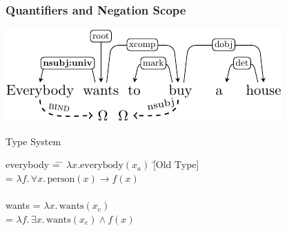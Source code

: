 \documentclass[mathserif,12pt]{beamer}
\renewcommand{\land}{\wedge}
\newcommand{\lspace}{.\,}
\begin{document}
\begin{frame}
\frametitle{Quantifiers and Negation Scope}
\centering
\includegraphics[trim=0em 0em 0em 0em,clip=true,scale=1.1]{figures/everybody-wants-buy-house-enhanced-with-univ-crop}

\begin{block}{\large Type System}
\large
\begin{tabbing}
everybody \= =  \= $\lambda x. \mathrm{everybody}(x_a)$ \hspace{2.8em} \=  [Old Type]\\
\> = \> $\lambda f \lspace \forall x \lspace \mathrm{person}(x) \rightarrow f(x)$   \\

\\

wants \> = \> $\lambda x  \lspace \mathrm{wants}(x_e) $   \\
\> = \> $\lambda f \lspace \exists x \lspace \mathrm{wants}(x_e) \land f(x)$  

\end{tabbing}
\end{block}
\end{frame} 
\end{document}
